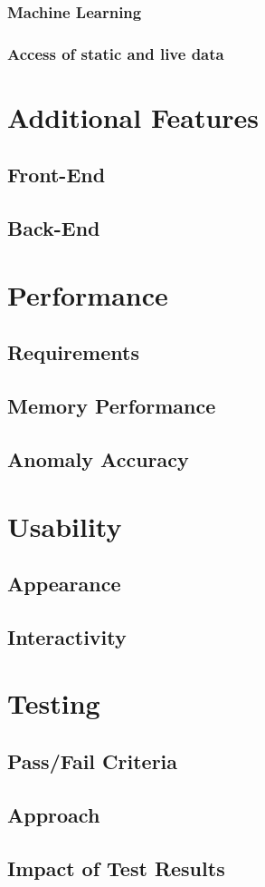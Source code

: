 \documentclass[11pt]{report}
\begin{document}
\subsubsection{Machine Learning}
\subsubsection{Access of static and live data}

\section{Additional Features}
\subsection{Front-End}
\subsection{Back-End}

\section{Performance}
\subsection{Requirements}
\subsection{Memory Performance}
\subsection{Anomaly Accuracy}

\section{Usability}
\subsection{Appearance}
\subsection{Interactivity}

\section{Testing}
\subsection{Pass/Fail Criteria}
\subsection{Approach}
\subsection{Impact of Test Results}
\end{document}
